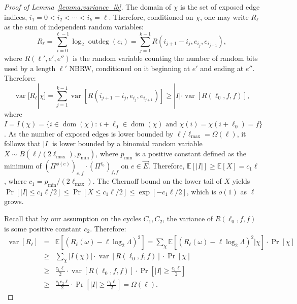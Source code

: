 \documentclass{article}
\newcommand{\dirE}{\vec{E}}
\newcommand{\E}{\mathbb{E}} %
\DeclareMathOperator{\var}{var}
\DeclareMathOperator{\outdeg}{outdeg}
\DeclareMathOperator{\dom}{dom}
\begin{document}
\begin{proof}[Proof of Lemma~\ref{lemma:variance_lb}]
    The domain of $\chi$ is the set of exposed edge indices, $i_1=0 < i_2 < \cdots < i_k=\ell$.
    Therefore, conditioned on $\chi$, one may write $R_\ell$ as the sum of independent random variables:
    \begin{equation*}
        R_\ell = \sum_{i=0}^{\ell-1} \log_2 \outdeg(e_i) = \sum_{j=1}^{k-1} R(i_{j+1}-i_j,e_{i_j},e_{i_{j+1}}),
    \end{equation*}
    where $R(\ell',e',e'')$ is the random variable counting the number of random bits used by a length $\ell'$ NBRW, conditioned on it beginning at $e'$ and ending at $e''$.
    Therefore:
    \begin{equation*}
        \var[R_\ell | \chi]
           = \sum_{j=1}^{k-1} \var\!\left[R(i_{j+1}-i_j,e_{i_j},e_{i_{j+1}})\right]
           \geq |I| \cdot \var\!\left[R(\ell_0,f,f)\right],
    \end{equation*}
    where $I = I(\chi) = \{i \in  \dom(\chi) :\, i+\ell_0 \in \dom(\chi) \mbox{ and } \chi(i) = \chi(i+\ell_0) = f\}$.
    As the number of exposed edges is lower bounded by $\ell/\ell_{\max} = \Omega(\ell)$,
    it follows that $|I|$ is lower bounded by a binomial random variable $X \sim B(\ell/(2\ell_{\max}),p_{\min})$, 
    where $p_{\min}$ is a positive constant defined as the minimum of $(\Pi^{\phi(e)})_{e,f} \cdot (\Pi^{\ell_0})_{f,f}$ on $e \in \dirE$. 
    Therefore, $\E[|I|] \geq \E[X] = c_1 \ell$, where $c_1 = p_{\min}/(2 \ell_{\max})$.
    The Chernoff bound on the lower tail of $X$ yields $\Pr[|I| \leq c_1 \ell/2] \leq \Pr[X \leq c_1 \ell/2] \leq \exp[-c_1 \ell/2]$, which is $o(1)$ as $\ell$ grows.

    Recall that by our assumption on the cycles $C_1, C_2$, the variance of $R(\ell_0,f,f)$ is some positive constant $c_2$.
    Therefore:
    \begin{eqnarray*}
        \var[R_\ell]
        &=& \E\!\left[{(R_\ell(\omega) - \ell \log_2\Lambda)}^2\right]
        = \sum_\chi \E\!\left[{(R_\ell(\omega) - \ell \log_2\Lambda)}^2 \Big\vert \chi\right] \cdot \Pr[\chi] \\
        &\geq& \sum_\chi |I(\chi)| \cdot \var\!\left[R(\ell_0,f,f)\right] \cdot \Pr[\chi] \\
        &\geq& \frac{c_1 \ell}{2} \cdot \var\!\left[R(\ell_0,f,f)\right] \cdot \Pr\!\left[|I| \geq \frac{c_1 \ell}{2}\right] \\
        &\geq& \frac{c_1 c_2 \ell}{2} \cdot \Pr\!\left[|I| \geq \frac{c_1 \ell}{2}\right]
        = \Omega(\ell).
    \end{eqnarray*}
\end{proof}
\end{document}
